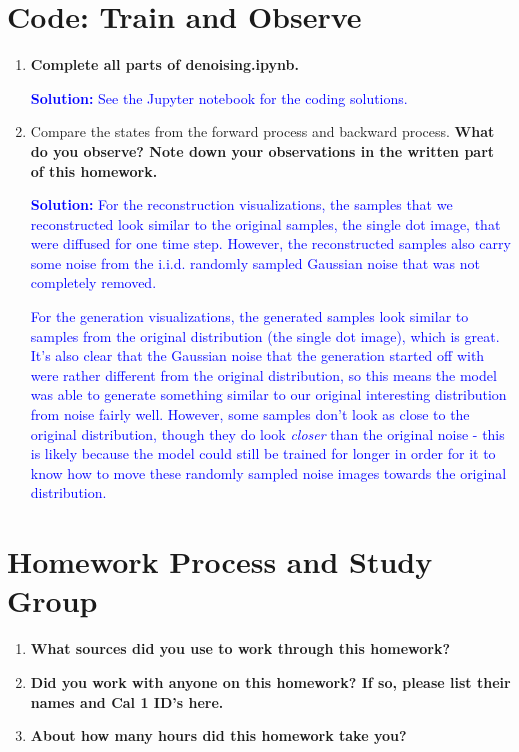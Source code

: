 \documentclass{article}
\begin{document}
\section{Code: Train and Observe}
\begin{enumerate}
    \item
        \textbf{Complete all parts of 
        denoising.ipynb.}
        
    \textcolor{blue}{
        \textbf{Solution: } See the Jupyter notebook for the coding solutions.
    }
    
    \item 
        Compare the states from the forward process and backward process. \textbf{What do you observe? Note down your observations in the written part of this homework.}
    
    \textcolor{blue}{
        \textbf{Solution: } For the reconstruction visualizations, the samples that we reconstructed look similar to the original samples, the single dot image, that were diffused for one time step. However, the reconstructed samples also carry some noise from the i.i.d. randomly sampled Gaussian noise that was not completely removed.
    }
    
    \textcolor{blue}{
        For the generation visualizations, the generated samples look similar to samples from the original distribution (the single dot image), which is great. It's also clear that the Gaussian noise that the generation started off with were rather different from the original distribution, so this means the model was able to generate something similar to our original interesting distribution from noise fairly well. However, some samples don't look as close to the original distribution, though they do look \textit{closer} than the original noise - this is likely because the model could still be trained for longer in order for it to know how to move these randomly sampled noise images towards the original distribution.
    }
\end{enumerate}

\section{Homework Process and Study Group}
\begin{enumerate}
    \item
        \textbf{What sources did you use to work through this homework?}
    \item
        \textbf{Did you work with anyone on this homework? If so, please list their names and Cal 1 ID's here.}
    \item
        \textbf{About how many hours did this homework take you?}
\end{enumerate}
\end{document}
